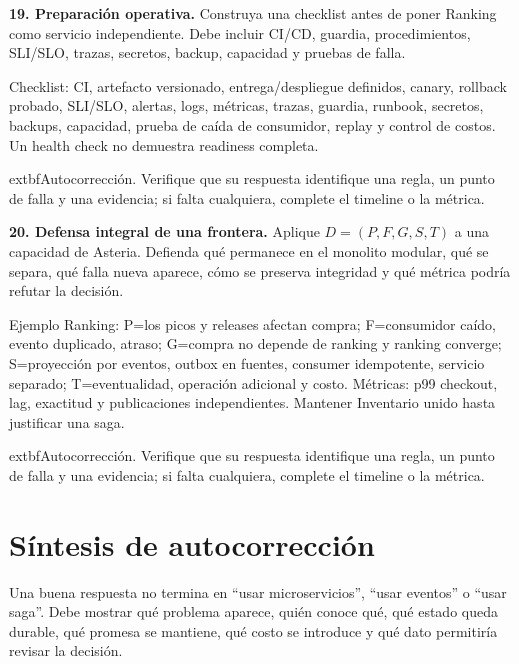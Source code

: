 \documentclass[variant=guiaresuelta,cover=institutional,mode=screen]{ua-engineering-v6-article}
\begin{document}
\begin{uaexercise}
\textbf{19. Preparación operativa.} Construya una checklist antes de poner Ranking como servicio independiente. Debe incluir CI/CD, guardia, procedimientos, SLI/SLO, trazas, secretos, backup, capacidad y pruebas de falla.
\end{uaexercise}
\begin{uaanswer}
Checklist: CI, artefacto versionado, entrega/despliegue definidos, canary, rollback probado, SLI/SLO, alertas, logs, métricas, trazas, guardia, runbook, secretos, backups, capacidad, prueba de caída de consumidor, replay y control de costos. Un health check no demuestra readiness completa.
\par\smallskip	extbf{Autocorrección.} Verifique que su respuesta identifique una regla, un punto de falla y una evidencia; si falta cualquiera, complete el timeline o la métrica.
\end{uaanswer}
\begin{uaexercise}
\textbf{20. Defensa integral de una frontera.} Aplique $D=(P,F,G,S,T)$ a una capacidad de Asteria. Defienda qué permanece en el monolito modular, qué se separa, qué falla nueva aparece, cómo se preserva integridad y qué métrica podría refutar la decisión.
\end{uaexercise}
\begin{uaanswer}
Ejemplo Ranking: P=los picos y releases afectan compra; F=consumidor caído, evento duplicado, atraso; G=compra no depende de ranking y ranking converge; S=proyección por eventos, outbox en fuentes, consumer idempotente, servicio separado; T=eventualidad, operación adicional y costo. Métricas: p99 checkout, lag, exactitud y publicaciones independientes. Mantener Inventario unido hasta justificar una saga.
\par\smallskip	extbf{Autocorrección.} Verifique que su respuesta identifique una regla, un punto de falla y una evidencia; si falta cualquiera, complete el timeline o la métrica.
\end{uaanswer}
\section{Síntesis de autocorrección}
Una buena respuesta no termina en ``usar microservicios'', ``usar eventos'' o ``usar saga''. Debe mostrar qué problema aparece, quién conoce qué, qué estado queda durable, qué promesa se mantiene, qué costo se introduce y qué dato permitiría revisar la decisión.
\end{document}
